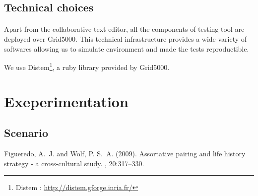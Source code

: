 \documentclass[twoside,twocolumn]{article}
\begin{document}
\subsection{Technical choices}
\paragraph{}
Apart from the collaborative text editor, all the components of testing tool are deployed over Grid5000. This technical infrastructure provides a wide variety
of softwares allowing us to simulate environment and made the tests reproductible.

We use Distem\footnote{Distem : \url{http://distem.gforge.inria.fr/}}, a ruby library provided by Grid5000.





\section{Exeperimentation}

\subsection{Scenario}





\begin{thebibliography}{99} %

Figueredo, A.~J. and Wolf, P. S.~A. (2009).
\newblock Assortative pairing and life history strategy - a cross-cultural
  study.
, 20:317--330.

\end{thebibliography}

\end{document}
